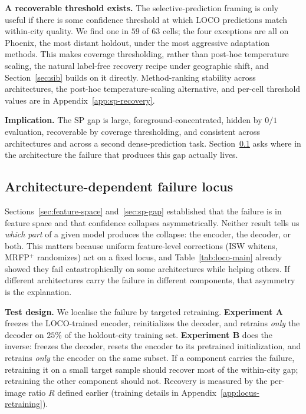 \textbf{A recoverable threshold exists.} The selective-prediction framing is only useful if there is some confidence threshold at which LOCO predictions match within-city quality. We find one in $59$ of $63$ cells; the four exceptions are all on Phoenix, the most distant holdout, under the most aggressive adaptation methods. This makes coverage thresholding, rather than post-hoc temperature scaling, the natural label-free recovery recipe under geographic shift, and Section~\ref{sec:sib} builds on it directly. Method-ranking stability across architectures, the post-hoc temperature-scaling alternative, and per-cell threshold values are in Appendix~\ref{app:sp-recovery}.

\textbf{Implication.} The SP gap is large, foreground-concentrated, hidden by $0/1$ evaluation, recoverable by coverage thresholding, and consistent across architectures and across a second dense-prediction task. Section~\ref{sec:architecture-locus} asks where in the architecture the failure that produces this gap actually lives.

\subsection{Architecture-dependent failure locus}
\label{sec:architecture-locus}

Sections~\ref{sec:feature-space} and~\ref{sec:sp-gap} established that the failure is in feature space and that confidence collapses asymmetrically. Neither result tells us \emph{which part} of a given model produces the collapse: the encoder, the decoder, or both. This matters because uniform feature-level corrections (ISW whitens, MRFP$^+$ randomizes) act on a fixed locus, and Table~\ref{tab:loco-main} already showed they fail catastrophically on some architectures while helping others. If different architectures carry the failure in different components, that asymmetry is the explanation.

\textbf{Test design.} We localise the failure by targeted retraining. \textbf{Experiment A} freezes the LOCO-trained encoder, reinitializes the decoder, and retrains \emph{only} the decoder on $25\%$ of the holdout-city training set. \textbf{Experiment B} does the inverse: freezes the decoder, resets the encoder to its pretrained initialization, and retrains \emph{only} the encoder on the same subset. If a component carries the failure, retraining it on a small target sample should recover most of the within-city gap; retraining the other component should not. Recovery is measured by the per-image ratio $R$ defined earlier (training details in Appendix~\ref{app:locus-retraining}).

